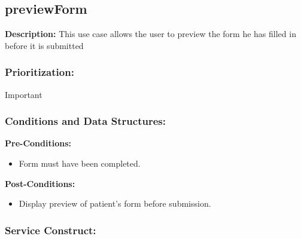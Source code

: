 \subsection{previewForm}
\textbf{Description:}
This use case allows the user to preview the form he has filled in before it is submitted
\subsubsection{Prioritization:}
Important
\subsubsection{Conditions and Data Structures:}
\textbf{Pre-Conditions:}
\begin{itemize}
	\item Form must have been completed.
\end{itemize}

\textbf{Post-Conditions:}
\begin{itemize}
	\item Display preview of patient’s form before submission.
\end{itemize}
 
\subsubsection{Service Construct:}
